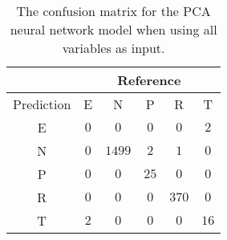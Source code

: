 \begin{table}[!ht]
	\centering
	\begin{tabular}{|c|c|c|c|c|c|}
		\hline
		 & \multicolumn{5}{|c|}{Reference} \\ \hline
		 Prediction & E & N & P & R & T \\ \hline
		 E & $0$ & $0$ & $0$ & $0$ & $2$ \\ \hline
		 N & $0$ & $1499$ & $2$ & $1$ & $0$ \\ \hline
		 P & $0$ & $0$ & $25$ & $0$ & $0$ \\ \hline
		 R & $0$ & $0$ & $0$ & $370$ & $0$ \\ \hline
		 T & $2$ & $0$ & $0$ & $0$ & $16$ \\ \hline
	\end{tabular}
	\caption{The confusion matrix for the PCA neural network model when using all variables as input.}
	\label{tab:cm:all:pcaNNet}
\end{table}
